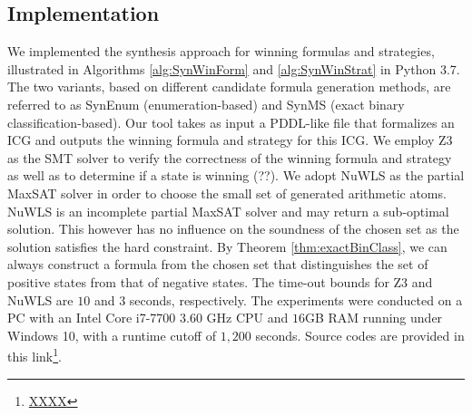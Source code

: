 \documentclass[review]{elsarticle}
\begin{document}

\subsection{Implementation}
We implemented the synthesis approach for winning formulas and strategies, illustrated in Algorithms \ref{alg:SynWinForm} and \ref{alg:SynWinStrat} in Python 3.7.
The two variants, based on different candidate formula generation methods, are referred to as SynEnum (enumeration-based) and SynMS (exact binary classification-based).
Our tool takes as input a PDDL-like file that formalizes an ICG and outputs the winning formula and strategy for this ICG.
We employ Z3 \cite{MouB2008} as the SMT solver to verify the correctness of the winning formula and strategy as well as to determine if a state is winning (??).
We adopt NuWLS \cite{ChuCL2023} as the partial MaxSAT solver in order to choose the small set of generated arithmetic atoms.
NuWLS is an incomplete partial MaxSAT solver and may return a sub-optimal solution.
This however has no influence on the soundness of the chosen set as the solution satisfies the hard constraint.
By Theorem \ref{thm:exactBinClass}, we can always construct a formula from the chosen set that distinguishes the set of positive states from that of negative states.
The time-out bounds for Z3 and NuWLS are $10$ and $3$ seconds, respectively.
The experiments were conducted on a PC with an Intel Core i7-7700 $3.60$ GHz CPU and $16$GB RAM running under Windows 10, with a runtime cutoff of $1,200$ seconds.
Source codes are provided in this link\footnote{\url{XXXX}}.
\end{document}
